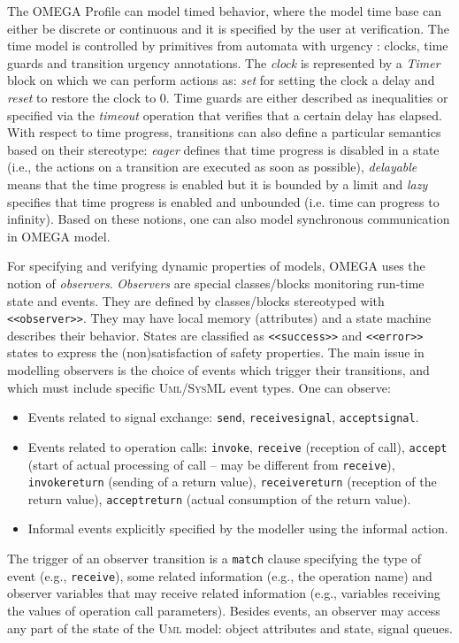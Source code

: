 \documentclass[a4paper,twoside]{article}
\def\sysml{\textsc{SysML}}
\def\uml{\textsc{Uml}}
\begin{document}
The OMEGA Profile can model timed behavior, where the model time base can either be discrete or continuous and it is specified by the user at verification. The time model is controlled by primitives from automata with urgency \cite{test12}: clocks, time guards and transition urgency annotations. The \textit{clock} is represented by a \textit{Timer} block on which we can perform actions as: \textit{set} for setting the clock a delay and \textit{reset} to restore the clock to 0. Time guards are either described as inequalities or specified via the \textit{timeout} operation  that verifies that a certain delay has elapsed. With respect to time progress, transitions can also define a particular semantics based on their stereotype: \textit{eager} defines that time progress is disabled in a state (i.e., the actions on a transition are executed as soon as possible), \textit{delayable} means that the time progress is enabled but it is bounded by a limit and \textit{lazy} specifies that time progress is enabled and unbounded (i.e. time can progress to infinity). Based on these notions, one can also model synchronous communication in OMEGA model.


For specifying and verifying dynamic properties of models, OMEGA uses the notion of \textit{observers}. \textit{Observers} are special classes/blocks monitoring run-time state and events. They are defined by classes/blocks stereotyped with \texttt{<<observer>>}. They may have local memory (attributes) and a state machine describes their behavior. States are classified as \texttt{<<success>>} and \texttt{<<error>>} states to express the (non)satisfaction of safety properties. The main issue in modelling observers is the choice of events which trigger their transitions, and which must include specific \uml{}/\sysml{} event types. One can observe:

\begin{itemize}
\item Events related to signal exchange: \texttt{send}, \texttt{receivesignal}, \texttt{acceptsignal}.
\item Events related to operation calls: \texttt{invoke}, \texttt{receive} (reception of call), \texttt{accept} (start of actual processing of call -- may be different from \texttt{receive}), \texttt{invokereturn} (sending of a 
return 	value), \texttt{receivereturn} (reception of the return value), \texttt{acceptreturn} (actual consumption of the return value).
\item Informal events explicitly specified by the modeller using the informal action.
\end{itemize}
The trigger of an observer transition is a \texttt{match} clause specifying the type of event (e.g., \texttt{receive}), some related information (e.g., the operation name) and observer variables that may receive related information (e.g., variables receiving the values of operation call parameters). Besides events, an observer may access any part of the state of the \uml{} model: object attributes and state, signal queues. 
\end{document}
